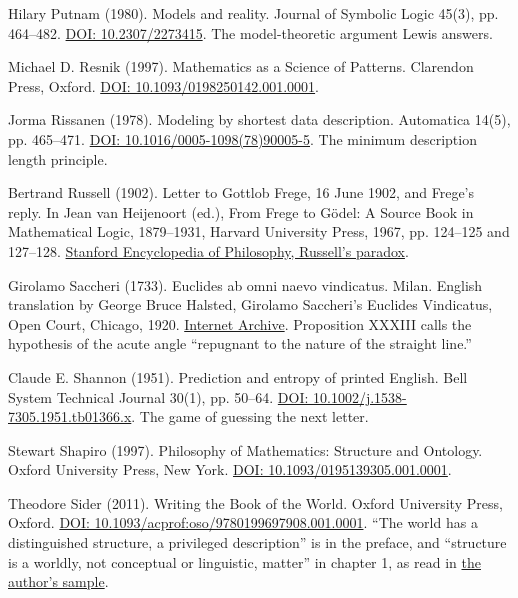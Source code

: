 \noindent Hilary Putnam (1980). Models and reality. Journal of Symbolic Logic 45(3), pp. 464--482. \href{https://doi.org/10.2307/2273415}{DOI: 10.2307/2273415}. The model-theoretic argument Lewis answers.
\par\medskip

\noindent Michael D. Resnik (1997). Mathematics as a Science of Patterns. Clarendon Press, Oxford. \href{https://doi.org/10.1093/0198250142.001.0001}{DOI: 10.1093/0198250142.001.0001}.
\par\medskip

\noindent Jorma Rissanen (1978). Modeling by shortest data description. Automatica 14(5), pp. 465--471. \href{https://doi.org/10.1016/0005-1098(78)90005-5}{DOI: 10.1016/0005-1098(78)90005-5}. The minimum description length principle.
\par\medskip

\noindent Bertrand Russell (1902). Letter to Gottlob Frege, 16 June 1902, and Frege's reply. In Jean van Heijenoort (ed.), From Frege to G\"odel: A Source Book in Mathematical Logic, 1879--1931, Harvard University Press, 1967, pp. 124--125 and 127--128. \href{https://plato.stanford.edu/entries/russell-paradox/}{Stanford Encyclopedia of Philosophy, Russell's paradox}.
\par\medskip

\noindent Girolamo Saccheri (1733). Euclides ab omni naevo vindicatus. Milan. English translation by George Bruce Halsted, Girolamo Saccheri's Euclides Vindicatus, Open Court, Chicago, 1920. \href{https://archive.org/details/girolamosacceri00saccuoft}{Internet Archive}. Proposition XXXIII calls the hypothesis of the acute angle ``repugnant to the nature of the straight line.''
\par\medskip

\noindent Claude E. Shannon (1951). Prediction and entropy of printed English. Bell System Technical Journal 30(1), pp. 50--64. \href{https://doi.org/10.1002/j.1538-7305.1951.tb01366.x}{DOI: 10.1002/j.1538-7305.1951.tb01366.x}. The game of guessing the next letter.
\par\medskip

\noindent Stewart Shapiro (1997). Philosophy of Mathematics: Structure and Ontology. Oxford University Press, New York. \href{https://doi.org/10.1093/0195139305.001.0001}{DOI: 10.1093/0195139305.001.0001}.
\par\medskip

\noindent Theodore Sider (2011). Writing the Book of the World. Oxford University Press, Oxford. \href{https://doi.org/10.1093/acprof:oso/9780199697908.001.0001}{DOI: 10.1093/acprof:oso/9780199697908.001.0001}. ``The world has a distinguished structure, a privileged description'' is in the preface, and ``structure is a worldly, not conceptual or linguistic, matter'' in chapter 1, as read in \href{https://www.tedsider.org/books/wbotw_sample.pdf}{the author's sample}.
\par\medskip

